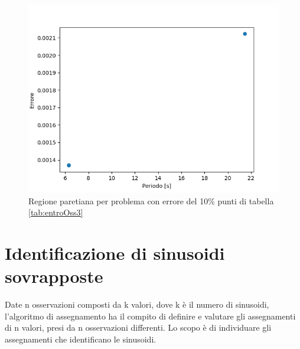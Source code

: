 \documentclass[a4paper,12pt]{report}
\begin{document}
\begin{itemize}

        \begin{figure}[H]
          \centering
          \includegraphics[scale=0.70]{img/entroOss/puls02/err10.png}
          \caption{Regione paretiana per problema con errore del 10\% punti di tabella \ref{tab:entroOss3}}
          \label{fig:entroOss_02_std_10err}
        \end{figure}

\end{itemize}





\chapter{Identificazione di sinusoidi sovrapposte}
Date n osservazioni composti da k valori, dove k è il numero di sinusoidi, l'algoritmo di assegnamento ha il compito di definire e valutare gli assegnamenti di n valori, presi da n osservazioni differenti. Lo scopo è di individuare gli assegnamenti che identificano le sinusoidi.





\end{document}
